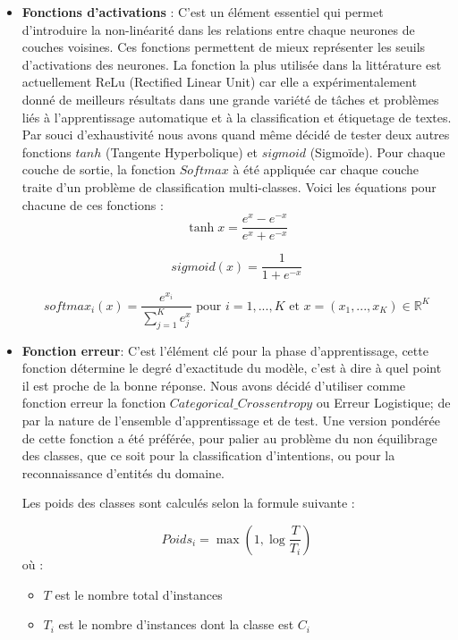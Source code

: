 \begin{itemize}
		\item \textbf{Fonctions d'activations} : 
		C'est un élément essentiel qui permet d'introduire la non-linéarité dans les relations entre chaque neurones de couches voisines. Ces fonctions permettent de mieux représenter les seuils d'activations des neurones. La fonction la plus utilisée dans la littérature est actuellement ReLu (Rectified Linear Unit) car elle a expérimentalement donné de meilleurs résultats dans une grande variété de tâches et problèmes liés à l'apprentissage automatique et à la classification et étiquetage de textes. Par souci d'exhaustivité nous avons quand même décidé de tester deux autres fonctions $tanh$ (Tangente Hyperbolique) et $sigmoid$ (Sigmoïde). Pour chaque couche de sortie, la fonction $Softmax$ à été appliquée car chaque couche traite d'un problème de classification multi-classes. Voici les équations pour chacune de ces fonctions :
		\begin{equation*}
			\tanh{x} = \frac{e^{x}-e^{-x}}{e^x+e^{-x}}
		\end{equation*}
		
		\begin{equation*}
			sigmoid(x) = \frac{1}{1+e^{-x}}
		\end{equation*}
		
		\begin{equation*}
			softmax_i(x) = \frac{e^{x_i}}{\sum_{j=1}^{K}e{^x_j}} \text{ pour } i=1,...,K \text{ et } x=(x_1,...,x_K) \in \mathbb{R}^K
		\end{equation*}
		\item \textbf{Fonction erreur}:
		C'est l'élément clé pour la phase d'apprentissage, cette fonction détermine le degré d'exactitude du modèle, c'est à dire à quel point il est proche de la bonne réponse. Nous avons décidé d'utiliser comme fonction erreur la fonction $Categorical\_Crossentropy$ ou Erreur Logistique; de par la nature de l'ensemble d'apprentissage et de test. Une version pondérée de cette fonction a été préférée, pour palier au problème du non équilibrage des classes, que ce soit pour la classification d'intentions, ou pour la reconnaissance d'entités du domaine.\\
		\par
		Les poids des classes sont calculés selon la formule suivante : 
		
		\begin{equation*}
			Poids_i = \max(1,\log{\frac{T}{T_i}})
		\end{equation*}
		où :
		\begin{itemize}
			\item  $T$ est le nombre total d'instances
			\item  $T_i$ est le nombre d'instances dont la classe est $C_i$
		\end{itemize}
		

\end{itemize}
